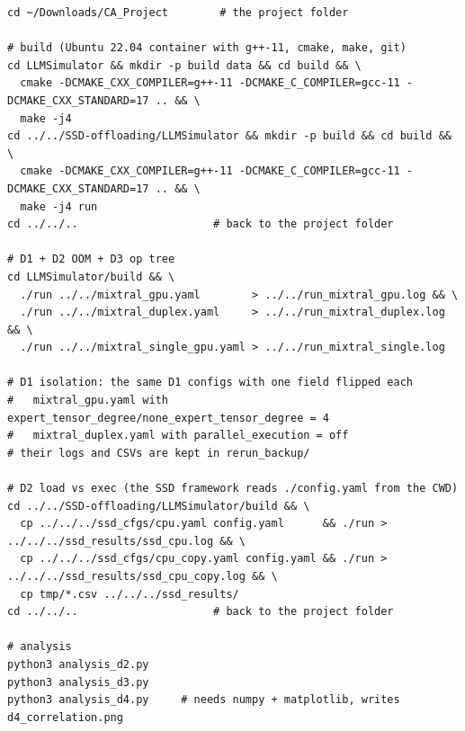 \documentclass[11pt,a4paper]{report}
\begin{document}
\begin{lstlisting}
cd ~/Downloads/CA_Project        # the project folder

# build (Ubuntu 22.04 container with g++-11, cmake, make, git)
cd LLMSimulator && mkdir -p build data && cd build && \
  cmake -DCMAKE_CXX_COMPILER=g++-11 -DCMAKE_C_COMPILER=gcc-11 -DCMAKE_CXX_STANDARD=17 .. && \
  make -j4
cd ../../SSD-offloading/LLMSimulator && mkdir -p build && cd build && \
  cmake -DCMAKE_CXX_COMPILER=g++-11 -DCMAKE_C_COMPILER=gcc-11 -DCMAKE_CXX_STANDARD=17 .. && \
  make -j4 run
cd ../../..                     # back to the project folder

# D1 + D2 OOM + D3 op tree
cd LLMSimulator/build && \
  ./run ../../mixtral_gpu.yaml        > ../../run_mixtral_gpu.log && \
  ./run ../../mixtral_duplex.yaml     > ../../run_mixtral_duplex.log && \
  ./run ../../mixtral_single_gpu.yaml > ../../run_mixtral_single.log

# D1 isolation: the same D1 configs with one field flipped each
#   mixtral_gpu.yaml with expert_tensor_degree/none_expert_tensor_degree = 4
#   mixtral_duplex.yaml with parallel_execution = off
# their logs and CSVs are kept in rerun_backup/

# D2 load vs exec (the SSD framework reads ./config.yaml from the CWD)
cd ../../SSD-offloading/LLMSimulator/build && \
  cp ../../../ssd_cfgs/cpu.yaml config.yaml      && ./run > ../../../ssd_results/ssd_cpu.log && \
  cp ../../../ssd_cfgs/cpu_copy.yaml config.yaml && ./run > ../../../ssd_results/ssd_cpu_copy.log && \
  cp tmp/*.csv ../../../ssd_results/
cd ../../..                     # back to the project folder

# analysis
python3 analysis_d2.py
python3 analysis_d3.py
python3 analysis_d4.py     # needs numpy + matplotlib, writes d4_correlation.png
\end{lstlisting}
\end{document}
